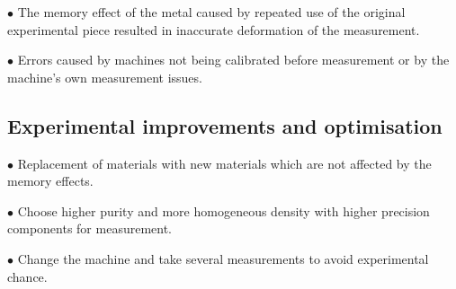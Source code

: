 $\bullet$ The memory effect of the metal caused by repeated use of the original 
experimental piece resulted in inaccurate deformation of the measurement.

$\bullet$ Errors caused by machines not being calibrated before measurement or 
by the machine's own measurement issues.

\subsection*{Experimental improvements and optimisation}

$\bullet$ Replacement of materials with new materials which are not affected by 
the memory effects.

$\bullet$ Choose higher purity and more homogeneous density with higher precision 
components for measurement.

$\bullet$ Change the machine and take several measurements to avoid experimental chance.
\fi